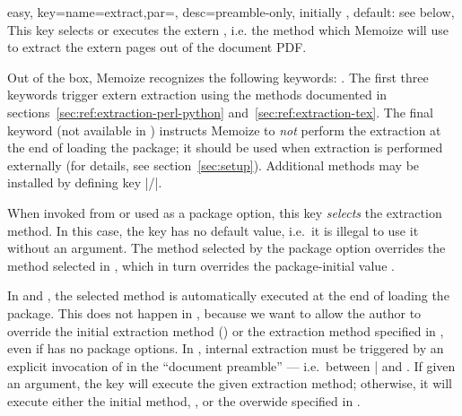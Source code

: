 \documentclass[a4paper,11pt]{article}
\begin{document}
\begin{doc}{easy,
    key={name=extract,par=,
      desc={preamble-only, initially , default: see below}},
  }
  This key selects or executes the extern , i.e. the
  method which Memoize will use to extract the extern pages out of the document
  PDF.

  Out of the box, Memoize recognizes the following 
  keywords: .  The
  first three keywords trigger extern extraction using the methods documented
  in sections~\ref{sec:ref:extraction-perl-python}
  and~\ref{sec:ref:extraction-tex}.  The final keyword (not available in
  ) instructs Memoize to \emph{not} perform the extraction at
  the end of loading the package; it should be used when extraction is
  performed externally (for details, see section~\ref{sec:setup}).  Additional
  methods may be installed by defining key |/|.
  
  When invoked from  or used as a package option, this key
  \emph{selects} the extraction method.  In this case, the key has no default
  value, i.e.\ it is illegal to use it without an argument.  The method
  selected by the package option overrides the method selected in
  , which in turn overrides the package-initial value
  .

  In  and , the selected method is automatically
  executed at the end of loading the package.  This does not happen in
  , because we want to allow the author to override the
  initial extraction method () or the extraction method
  specified in , even if  has no package
  options.  In , internal extraction must be triggered by an
  explicit invocation of  in the ``document preamble'' ---
  i.e.\ between | and .  If given an  argument, the key will
  execute the given extraction method; otherwise, it will execute either the
  initial method, , or the overwide specified in
  .


\end{doc}
\end{document}
